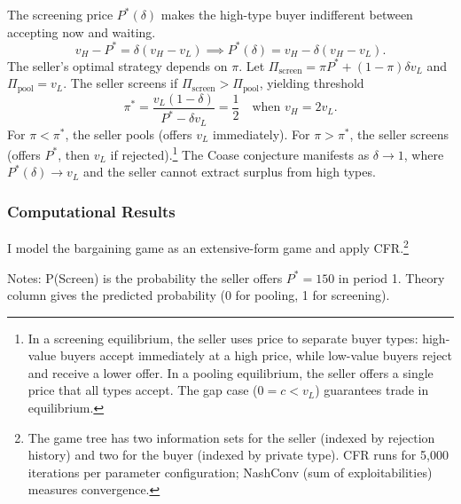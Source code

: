 The screening price $P^*(\delta)$ makes the high-type buyer indifferent between accepting now and waiting.
\begin{equation}
v_H - P^* = \delta(v_H - v_L) \implies P^*(\delta) = v_H - \delta(v_H - v_L).
\end{equation}
The seller's optimal strategy depends on $\pi$. Let $\Pi_{\text{screen}} = \pi P^* + (1-\pi)\delta v_L$ and $\Pi_{\text{pool}} = v_L$. The seller screens if $\Pi_{\text{screen}} > \Pi_{\text{pool}}$, yielding threshold
\begin{equation}
\pi^* = \frac{v_L(1-\delta)}{P^* - \delta v_L} = \frac{1}{2} \quad \text{when } v_H = 2v_L.
\end{equation}
For $\pi < \pi^*$, the seller pools (offers $v_L$ immediately). For $\pi > \pi^*$, the seller screens (offers $P^*$, then $v_L$ if rejected).\footnote{In a screening equilibrium, the seller uses price to separate buyer types: high-value buyers accept immediately at a high price, while low-value buyers reject and receive a lower offer. In a pooling equilibrium, the seller offers a single price that all types accept. The gap case ($0 = c < v_L$) guarantees trade in equilibrium.} The Coase conjecture manifests as $\delta \to 1$, where $P^*(\delta) \to v_L$ and the seller cannot extract surplus from high types.

\subsubsection{Computational Results}

I model the bargaining game as an extensive-form game and apply CFR.\footnote{The game tree has two information sets for the seller (indexed by rejection history) and two for the buyer (indexed by private type). CFR runs for 5,000 iterations per parameter configuration; NashConv (sum of exploitabilities) measures convergence.}

\begin{table}[htbp]
\centering
\caption[CFR equilibrium vs.\ theory: $\pi$-sweep at $\delta = 0.5$]{\textbf{CFR equilibrium vs.\ theory: $\pi$-sweep at $\delta = 0.5$.}}
\label{tab:coase}

\begin{minipage}{0.9\textwidth}
\footnotesize
Notes: P(Screen) is the probability the seller offers $P^* = 150$ in period 1. Theory column gives the predicted probability (0 for pooling, 1 for screening).
\end{minipage}
\end{table}

